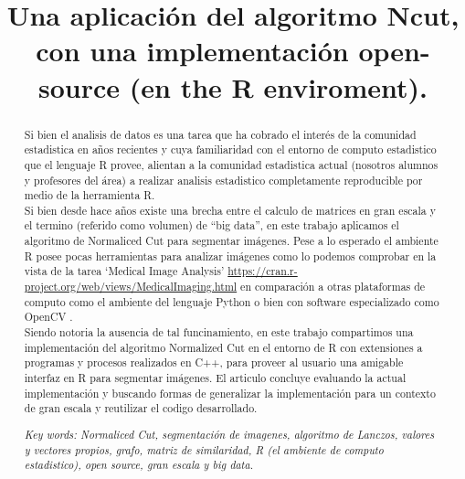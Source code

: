 \documentclass[conference]{IEEEtran}
\begin{document}
\title{Una aplicación del algoritmo Ncut, con una implementación open-source (en the R enviroment).  }


\author{
}



\maketitle

\begin{abstract}
Si bien el analisis de datos es una tarea que ha cobrado el interés de la comunidad estadistica en años recientes y cuya familiaridad con el entorno de computo estadistico que el lenguaje R provee, alientan a la comunidad estadistica actual (nosotros alumnos y profesores del área) a realizar analisis estadistico completamente reproducible por medio de la herramienta R. \\
Si bien desde hace años existe una brecha entre el calculo de matrices en gran escala y el termino (referido como volumen) de “big data”, en este trabajo aplicamos el algoritmo de Normaliced Cut para segmentar imágenes. Pese a lo esperado el ambiente R posee pocas herramientas para analizar imágenes como lo podemos comprobar en la vista de la tarea ‘Medical Image Analysis’ \url{https://cran.r-project.org/web/views/MedicalImaging.html} en comparación a otras plataformas de computo como el ambiente del lenguaje Python o bien con software especializado como OpenCV \cite{OpenCV}.\\ 
Siendo notoria la ausencia de tal funcinamiento, en este trabajo compartimos una implementación del algoritmo Normalized Cut en el entorno de R con extensiones a programas y procesos realizados en C++, para proveer al usuario una amigable interfaz en R para segmentar imágenes. El articulo concluye evaluando la actual implementación y buscando formas de generalizar la implementación para un contexto de gran escala y reutilizar el codigo desarrollado.

\textit{Key words: Normaliced Cut, segmentación de imagenes, algoritmo de Lanczos, valores y vectores propios, grafo, matriz de similaridad, R (el ambiente de computo estadistico), open source, gran escala y big data.
}\end{abstract}
\end{document}
